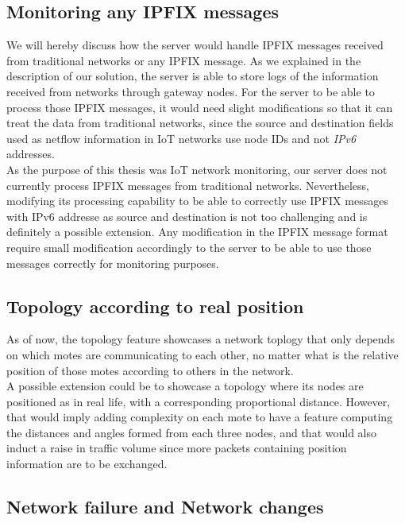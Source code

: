 \subsection{Monitoring any IPFIX messages}

We will hereby discuss how the server would handle IPFIX messages received from traditional networks or any IPFIX message. As we explained in the description of our solution, the server is able to store logs of the information received from networks through gateway nodes. For the server to be able to process those IPFIX messages, it would need slight modifications so that it can treat the data from traditional networks, since the source and destination fields used as netflow information in IoT networks use node IDs and not \textit{IPv6} addresses. \\

As the purpose of this thesis was IoT network monitoring, our server does not currently process IPFIX messages from traditional networks. Nevertheless, modifying its processing capability to be able to correctly use IPFIX messages with IPv6 addresse as source and destination is not too challenging and is 
definitely a possible extension. Any modification in the IPFIX message format require small modification accordingly to the server to be able to use those messages correctly for monitoring purposes.\\ 

\subsection{Topology according to real position}

As of now, the topology feature showcases a network toplogy that only depends on which motes are communicating to each other, no matter what is the relative position of those motes according to others in the network. \\

A possible extension could be to showcase a topology where its nodes are positioned as in real life, with a corresponding proportional distance. However, that would imply adding complexity on each mote to have a feature computing the distances and angles formed from each three nodes, and that would also induct a raise in traffic volume since more packets containing position information are to be exchanged.

\subsection{Network failure and Network changes}

